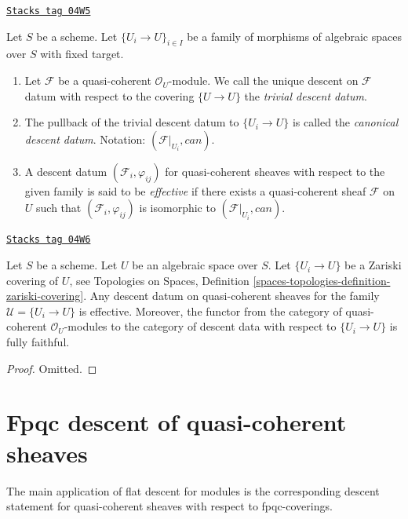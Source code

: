 \begin{definition}
\label{spaces-descent-definition-descent-datum-effective-quasi-coherent}
\href{https://stacks.math.columbia.edu/tag/04W5}{\texttt{Stacks tag 04W5}}

Let $S$ be a scheme.
Let $\{U_i \to U\}_{i \in I}$ be a family of morphisms of algebraic
spaces over $S$ with fixed target.
\begin{enumerate}
\item Let $\mathcal{F}$ be a quasi-coherent $\mathcal{O}_U$-module.
We call the unique descent on $\mathcal{F}$ datum with respect to the covering
$\{U \to U\}$ the {\it trivial descent datum}.
\item The pullback of the trivial descent datum to
$\{U_i \to U\}$ is called the {\it canonical descent datum}.
Notation: $(\mathcal{F}|_{U_i}, can)$.
\item A descent datum $(\mathcal{F}_i, \varphi_{ij})$
for quasi-coherent sheaves with respect to the given family
is said to be {\it effective} if there exists a quasi-coherent
sheaf $\mathcal{F}$ on $U$ such that $(\mathcal{F}_i, \varphi_{ij})$
is isomorphic to $(\mathcal{F}|_{U_i}, can)$.
\end{enumerate}
\end{definition}

\begin{lemma}
\label{spaces-descent-lemma-zariski-descent-effective}
\href{https://stacks.math.columbia.edu/tag/04W6}{\texttt{Stacks tag 04W6}}

Let $S$ be a scheme. Let $U$ be an algebraic space over $S$.
Let $\{U_i \to U\}$ be a Zariski covering of $U$, see
Topologies on Spaces,
Definition \ref{spaces-topologies-definition-zariski-covering}.
Any descent datum on quasi-coherent sheaves
for the family $\mathcal{U} = \{U_i \to U\}$ is
effective. Moreover, the functor from the category of
quasi-coherent $\mathcal{O}_U$-modules to the category
of descent data with respect to $\{U_i \to U\}$ is fully faithful.
\end{lemma}

\begin{proof}
Omitted.
\end{proof}

\section{Fpqc descent of quasi-coherent sheaves}
\label{spaces-descent-section-fpqc-descent-quasi-coherent}
The main application of flat descent for modules is
the corresponding descent statement for quasi-coherent
sheaves with respect to fpqc-coverings.

